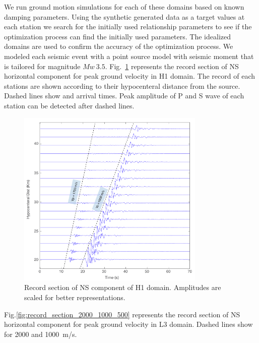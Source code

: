 We run ground motion simulations for each of these domains based on known damping parameters. Using the synthetic generated data as a target values at each station we search for the initially used \qsvs{} relationship parameters to see if the optimization process can find the initially used parameters. The idealized domains are used to confirm the accuracy of the optimization process. We modeled each seismic event with a point source model with seismic moment that is tailored for magnitude $Mw~3.5$. Fig.~\ref{fig:record_section_1000} represents the record section of NS horizontal component for peak ground velocity in H1 domain. The record of each stations are shown according to their hypocenteral distance from the source. Dashed lines show \vp{} and \vs{} arrival times. Peak amplitude of P and S wave of each station can be detected after dashed lines. 

  \begin{figure}[ht]
    \centering
    \includegraphics[width=0.8\textwidth]{figures/pdf/Figure_06.pdf}
    \caption{Record section of NS component of H1 domain. Amplitudes are scaled for better representations.}
    \label{fig:record_section_1000}
\end{figure}

Fig.\ref{fig:record_section_2000_1000_500} represents the record section of NS horizontal component for peak ground velocity in L3 domain. Dashed lines show \vs{} for 2000 and 1000~m/s. 

